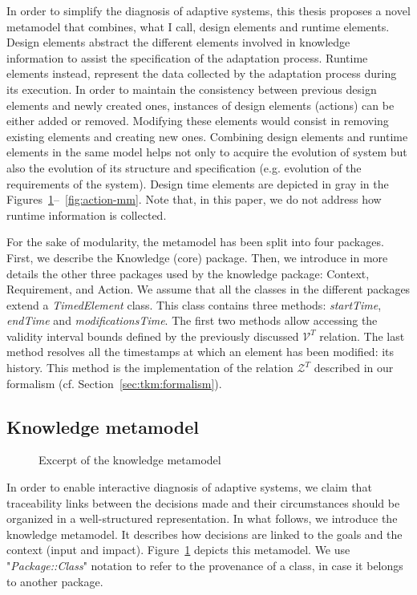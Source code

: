  In order to simplify the diagnosis of adaptive systems, this thesis proposes a novel metamodel that combines, what I call, design elements and runtime elements.
Design elements abstract the different elements involved in knowledge information to assist the specification of the adaptation process.
Runtime elements instead, represent the data collected by the adaptation process during its execution.
In order to maintain the consistency between previous design elements and newly created ones, instances of design elements (\eg actions) can be either added or removed.
Modifying these elements would consist in removing existing elements and creating new ones.
Combining design elements and runtime elements in the same model helps not only to acquire the evolution of system but also the evolution of its structure and specification (e.g. evolution of the requirements of the system).
Design time elements are depicted in gray in the Figures~\ref{fig:knowledge-mm}--~\ref{fig:action-mm}. Note that, in this paper, we do not address how runtime information is collected.

For the sake of modularity, the metamodel has been split into four packages.
First, we describe the Knowledge (core) package. 
Then, we introduce in more details the other three packages used by the knowledge package: Context, Requirement, and Action. 
We assume that all the classes in the different packages extend a \textit{TimedElement} class. 
This class contains three methods: \textit{startTime}, \textit{endTime} and \textit{modificationsTime}.
The first two methods allow accessing the validity interval bounds defined by the previously discussed $\mathcal{V}^T$ relation.
The last method resolves all the timestamps at which an element has been modified: its history. 
This method is the implementation of the relation $\mathcal{Z}^T$ described in our formalism (cf. Section~\ref{sec:tkm:formalism}).

\subsection{Knowledge metamodel}

\begin{figure}[t]
	\begin{center}
	\caption{Excerpt of the knowledge metamodel}
	\label{fig:knowledge-mm}
	\end{center} 
\end{figure}

In order to enable interactive diagnosis of adaptive systems, we claim that traceability links between the decisions made and their circumstances should be organized in a well-structured representation.  In what follows, we introduce the knowledge metamodel. It describes how decisions are linked to the goals and the context (input and impact). Figure~\ref{fig:knowledge-mm} depicts this metamodel. We use "\textit{Package::Class}" notation to refer to the provenance of a class, in case it belongs to another package. 

